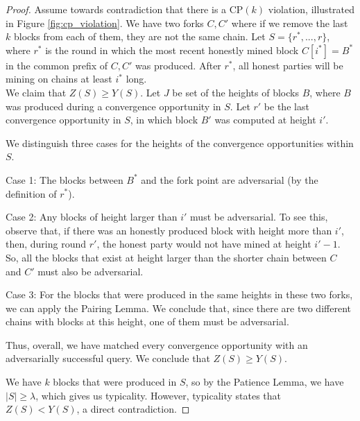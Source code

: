 \begin{proof}
Assume towards contradiction that there is a CP$(k)$ violation, illustrated in Figure \ref{fig:cp_violation}.
We have two forks $C, C'$ where if we remove the last $k$ blocks from each of them, they are not the same chain. Let $S = \{ r^*, ..., r\}$, where $r^*$ is the round in which the most recent honestly mined block $C[i^*] = B^*$ in the common prefix of $C, C'$ was produced. After $r^*$, all honest parties will be mining on chains at least $i^*$ long. \\

We claim that $Z(S) \geq Y(S)$. Let $J$ be set of the heights of blocks $B$, where $B$ was produced during a convergence opportunity in $S$. Let $r'$ be the last convergence opportunity in $S$, in which block $B'$ was computed at height $i'$.

We distinguish three cases for the heights of the convergence opportunities within $S$.

Case 1: The blocks between $B^*$ and the fork point are adversarial (by the definition of $r^*$).

Case 2: Any blocks of height larger than $i'$ must be adversarial. To see this, observe that, if there was an honestly produced block with height more than $i'$, then, during round $r'$, the honest party would not have mined at height $i' - 1$. So, all the blocks that exist at height larger than the shorter chain between $C$ and $C'$ must also be adversarial.

Case 3: For the blocks that were produced in the same heights in these two forks, we can apply the Pairing Lemma. We conclude that, since there are two different chains with blocks at this height, one of them must be adversarial.

Thus, overall, we have matched every convergence opportunity with an adversarially successful query. We conclude that $Z(S) \geq Y(S)$.

We have $k$ blocks that were produced in $S$, so by the Patience Lemma, we have $|S| \geq \lambda$, which gives us typicality. However, typicality states that $Z(S) < Y(S)$, a direct contradiction.
\end{proof}

